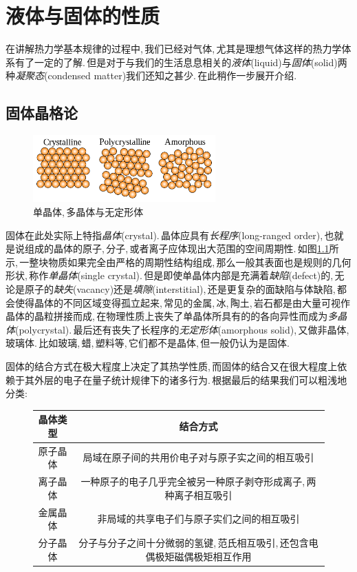 \chapter{液体与固体的性质}

在讲解热力学基本规律的过程中,\,我们已经对气体,\,尤其是理想气体这样的热力学体系有了一定的了解.\,但是对于与我们的生活息息相关的\emph{液体}(liquid)与\emph{固体}(solid)两种\emph{凝聚态}(condensed matter)我们还知之甚少.\,在此稍作一步展开介绍.

\section{固体晶格论}


\begin{figure}
\centering
\includegraphics[width=7cm]{image/5-3-2.png}
\caption{单晶体,\,多晶体与无定形体}\label{fig:3crystal}
\end{figure}
固体在此处实际上特指\emph{晶体}(crystal).\,晶体应具有\emph{长程序}(long-ranged order),\,也就是说组成的晶体的原子,\,分子,\,或者离子应体现出大范围的空间周期性.\,如图\ref{fig:3crystal}所示,\,一整块物质如果完全由严格的周期性结构组成,\,那么一般其表面也是规则的几何形状,\,称作\emph{单晶体}(single crystal).\,但是即使单晶体内部是充满着\emph{缺陷}(defect)的,\,无论是原子的\emph{缺失}(vacancy)还是\emph{填隙}(interstitial),\,还是更复杂的面缺陷与体缺陷,\,都会使得晶体的不同区域变得孤立起来,\,常见的金属,\,冰,\,陶土,\,岩石都是由大量可视作晶体的晶粒拼接而成,\,在物理性质上丧失了单晶体所具有的的各向异性而成为\emph{多晶体}(polycrystal).\,最后还有丧失了长程序的\emph{无定形体}(amorphous solid),\,又做非晶体,\,玻璃体.\,比如玻璃,\,蜡,\,塑料等,\,它们都不是晶体,\,但一般仍认为是固体.

固体的结合方式在极大程度上决定了其热学性质,\,而固体的结合又在很大程度上依赖于其外层的电子在量子统计规律下的诸多行为.\,根据最后的结果我们可以粗浅地分类:
\begin{figure}[H]
\centering
\begin{tabular}{c|c}
\hline
晶体类型			&		结合方式\\ \hline\hline
原子晶体			& 局域在原子间的共用价电子对与原子实之间的相互吸引 \\ \hline
离子晶体 		& 一种原子的电子几乎完全被另一种原子剥夺形成离子,\,两种离子相互吸引 \\ \hline
金属晶体			& 非局域的共享电子们与原子实们之间的相互吸引 \\ \hline
分子晶体 		& 分子与分子之间十分微弱的氢键,\,范氏相互吸引,\,还包含电偶极矩磁偶极矩相互作用 \\ \hline
\end{tabular}
\end{figure}


